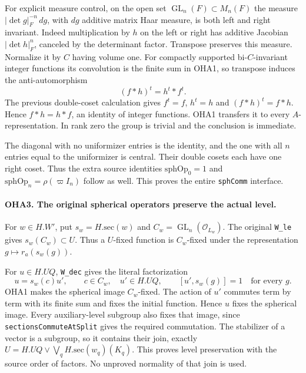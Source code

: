 For explicit measure control, on the open set
\(\operatorname{GL}_n(F)\subset M_n(F)\) the measure
\(|\det g|_F^{-n}\,dg\), with \(dg\) additive matrix Haar
measure, is both left and right invariant. Indeed multiplication
by \(h\) on the left or right has additive Jacobian
\(|\det h|_F^n\), canceled by the determinant factor.
Transpose preserves this measure. Normalize it by \(C\) having
volume one. For compactly supported bi-\(C\)-invariant integer
functions its convolution is the finite sum in OHA1, so
transpose induces the anti-automorphism
\[
                       (f*h)^t=h^t*f^t .
\]
The previous double-coset calculation gives \(f^t=f\), \(h^t=h\)
and \((f*h)^t=f*h\). Hence \(f*h=h*f\), an identity of integer
functions. OHA1 transfers it to every \(A\)-representation.
In rank zero the group is trivial and the conclusion is immediate.

The diagonal with no uniformizer entries is the identity, and
the one with all \(n\) entries equal to the uniformizer is central.
Their double cosets each have one right coset. Thus the extra
source identities \(\mathrm{sphOp}_0=1\) and
\(\mathrm{sphOp}_n=\rho(\varpi I_n)\) follow as well.
This proves the entire \texttt{sphComm} interface.

\paragraph{OHA3. The original spherical operators preserve the actual level.}
\label{claim:OHA3}
For \(w\in H.W'\), put \(s_w=H.\mathrm{sec}(w)\) and
\(C_w=\operatorname{GL}_n(\mathcal O_{L_w})\).
The original \texttt{W\_le} gives \(s_w(C_w)\subset U\).
Thus a \(U\)-fixed function is \(C_w\)-fixed under the
representation \(g\mapsto r_a(s_w(g))\).

For \(u\in H.UQ\), \texttt{W\_dec} gives the literal factorization
\[
          u=s_w(c)u',\qquad c\in C_w,\quad u'\in H.UQ,
          \qquad [u',s_w(g)]=1\quad\text{for every }g .
\]
OHA1 makes the spherical image \(C_w\)-fixed. The action of
\(u'\) commutes term by term with its finite sum and fixes the
initial function. Hence \(u\) fixes the spherical image.
Every auxiliary-level subgroup also fixes that image, since
\texttt{sectionsCommuteAtSplit} gives the required commutation.
The stabilizer of a vector is a subgroup, so it contains their
join, exactly \(U=H.UQ\vee\bigvee_q H.\mathrm{sec}(w_q)(K_q)\).
This proves level preservation with the source order of factors.
No unproved normality of that join is used.

